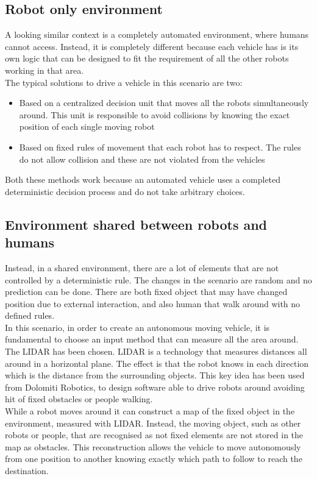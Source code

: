 \subsection{Robot only environment}
A looking similar context is a completely automated environment, where humans cannot access. Instead, it is completely different because each vehicle has is its own logic that can be designed to fit the requirement of all the other robots working in that area.\\
The typical solutions to drive a vehicle in this scenario are two:
\begin{itemize}
	\item Based on a centralized decision unit that moves all the robots simultaneously around. This unit is responsible to avoid collisions by knowing the exact position of each single moving robot
	\item Based on fixed rules of movement that each robot has to respect. The rules do not allow collision and these are not violated from the vehicles
\end{itemize}
Both these methods work because an automated vehicle uses a completed deterministic decision process and do not take arbitrary choices.

\subsection{Environment shared between robots and humans}
Instead, in a shared environment, there are a lot of elements that are not controlled by a deterministic rule. The changes in the scenario are random and no prediction can be done. There are both fixed object that may have changed position due to external interaction, and also human that walk around with no defined rules.\\
In this scenario, in order to create an autonomous moving vehicle, it is fundamental to choose an input method that can measure all the area around. The LIDAR has been chosen. LIDAR is a technology that measures distances all around in a horizontal plane. The effect is that the robot knows in each direction which is the distance from the surrounding objects. This key idea has been used from Dolomiti Robotics, to design software able to drive robots around avoiding hit of fixed obstacles or people walking.\\
While a robot moves around it can construct a map of the fixed object in the environment, measured with LIDAR. Instead, the moving object, such as other robots or people, that are recognised as not fixed elements are not stored in the map as obstacles. This reconstruction allows the vehicle to move autonomously from one position to another knowing exactly which path to follow to reach the destination.

